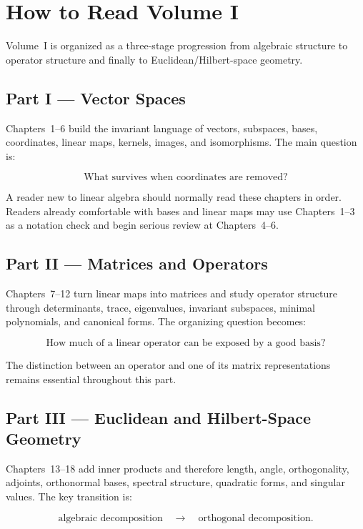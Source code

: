 \chapter*{How to Read Volume I}
\label{sec:i-how-to-read-volume}

Volume~I is organized as a three-stage progression from algebraic structure to
operator structure and finally to Euclidean/Hilbert-space geometry.

\section*{Part I — Vector Spaces}

Chapters~1--6 build the invariant language of vectors, subspaces, bases,
coordinates, linear maps, kernels, images, and isomorphisms. The main question
is:

\[
\boxed{\text{What survives when coordinates are removed?}}
\]

A reader new to linear algebra should normally read these chapters in order.
Readers already comfortable with bases and linear maps may use Chapters~1--3 as
a notation check and begin serious review at Chapters~4--6.

\section*{Part II — Matrices and Operators}

Chapters~7--12 turn linear maps into matrices and study operator structure
through determinants, trace, eigenvalues, invariant subspaces, minimal
polynomials, and canonical forms. The organizing question becomes:

\[
\boxed{\text{How much of a linear operator can be exposed by a good basis?}}
\]

The distinction between an operator and one of its matrix representations
remains essential throughout this part.

\section*{Part III — Euclidean and Hilbert-Space Geometry}

Chapters~13--18 add inner products and therefore length, angle, orthogonality,
adjoints, orthonormal bases, spectral structure, quadratic forms, and singular
values. The key transition is:

\[
\boxed{\text{algebraic decomposition}
\quad\longrightarrow\quad
\text{orthogonal decomposition}.}
\]

